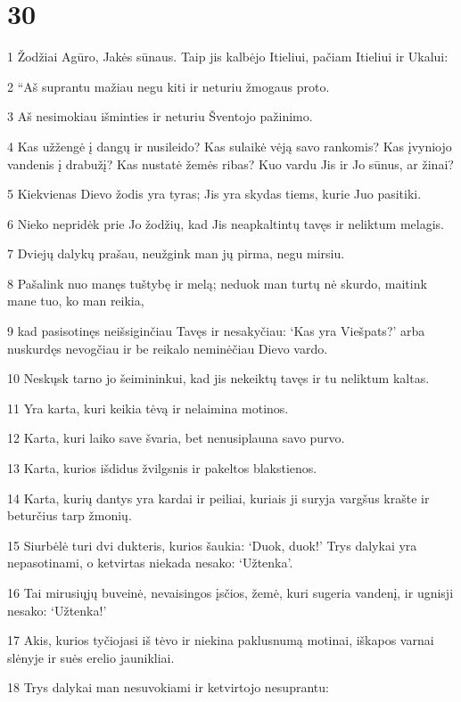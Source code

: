 \chapter{30}


\par 1 Žodžiai Agūro, Jakės sūnaus. Taip jis kalbėjo Itieliui, pačiam Itieliui ir Ukalui: 
\par 2 “Aš suprantu mažiau negu kiti ir neturiu žmogaus proto. 
\par 3 Aš nesimokiau išminties ir neturiu Šventojo pažinimo. 
\par 4 Kas užžengė į dangų ir nusileido? Kas sulaikė vėją savo rankomis? Kas įvyniojo vandenis į drabužį? Kas nustatė žemės ribas? Kuo vardu Jis ir Jo sūnus, ar žinai? 
\par 5 Kiekvienas Dievo žodis yra tyras; Jis yra skydas tiems, kurie Juo pasitiki. 
\par 6 Nieko nepridėk prie Jo žodžių, kad Jis neapkaltintų tavęs ir neliktum melagis. 
\par 7 Dviejų dalykų prašau, neužgink man jų pirma, negu mirsiu. 
\par 8 Pašalink nuo manęs tuštybę ir melą; neduok man turtų nė skurdo, maitink mane tuo, ko man reikia, 
\par 9 kad pasisotinęs neišsiginčiau Tavęs ir nesakyčiau: ‘Kas yra Viešpats?’ arba nuskurdęs nevogčiau ir be reikalo neminėčiau Dievo vardo. 
\par 10 Neskųsk tarno jo šeimininkui, kad jis nekeiktų tavęs ir tu neliktum kaltas. 
\par 11 Yra karta, kuri keikia tėvą ir nelaimina motinos. 
\par 12 Karta, kuri laiko save švaria, bet nenusiplauna savo purvo. 
\par 13 Karta, kurios išdidus žvilgsnis ir pakeltos blakstienos. 
\par 14 Karta, kurių dantys yra kardai ir peiliai, kuriais ji suryja vargšus krašte ir beturčius tarp žmonių. 
\par 15 Siurbėlė turi dvi dukteris, kurios šaukia: ‘Duok, duok!’ Trys dalykai yra nepasotinami, o ketvirtas niekada nesako: ‘Užtenka’. 
\par 16 Tai mirusiųjų buveinė, nevaisingos įsčios, žemė, kuri sugeria vandenį, ir ugnis­ji nesako: ‘Užtenka!’ 
\par 17 Akis, kurios tyčiojasi iš tėvo ir niekina paklusnumą motinai, iškapos varnai slėnyje ir suės erelio jaunikliai. 
\par 18 Trys dalykai man nesuvokiami ir ketvirtojo nesuprantu: 
